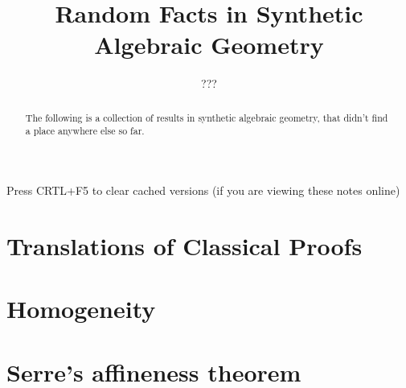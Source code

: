 \documentclass{../util/zariski}
\title{Random Facts in Synthetic Algebraic Geometry}
\author{???}
\begin{document}
\maketitle

\begin{center}
  \color{purple}
  \large{Press CRTL+F5 to clear cached versions}
  \large{(if you are viewing these notes online)}
\end{center}

\begin{abstract}
  The following is a collection of results in synthetic algebraic geometry,
  that didn't find a place anywhere else so far.
\end{abstract}

\tableofcontents

\section{Translations of Classical Proofs}


\section{Homogeneity}


\section{Serre's affineness theorem}


\printindex

\printbibliography
\end{document}
